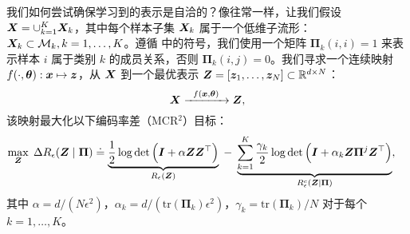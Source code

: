 \documentclass[../../book-main.tex]{subfiles}
\begin{document}

我们如何尝试确保学习到的表示是自洽的？像往常一样，让我们假设 $\bm{X} = \cup_{k=1}^K \bm{X}_k$，其中每个样本子集 $\bm{X}_k$ 属于一个低维子流形：$\bm{X}_k \subset \mathcal{M}_k, k = 1,\ldots, K$。遵循  中的符号，我们使用一个矩阵 $\bm \Pi_k(i,i) = 1$ 来表示样本 $i$ 属于类别 $k$ 的成员关系，否则 $\bm \Pi_k(i,j) = 0$。我们寻求一个连续映射 $f(\cdot,\bm \theta): \bm{x} \mapsto \bm{z}$，从 $\bm{X}$ 到一个最优表示 $\bm{Z} = [\bm{z}_1, \ldots, \bm{z}_N] \subset \mathbb{R}^{d \times N}$：
\begin{equation}
\bm X  \xrightarrow{\hspace{2mm} f(\bm{x}, \bm \theta) \hspace{2mm}} \bm Z, 
\label{eqn:LDR}
\end{equation}
该映射最大化以下编码率差（MCR$^2$）目标：
\begin{equation}\label{eq:mcr2-formulation}
\begin{split}
\max_{\Z} \; \Delta R_\epsilon(\Z  \mid \bm{\Pi}) %
&\doteq \underbrace{\frac{1}{2}\log\det \Big(\I + {\alpha} \Z \Z^\top \Big)}_{R_{\epsilon}(\Z)} \;-\; \underbrace{\sum_{k=1}^{K}\frac{\gamma_k}{2} \log\det\Big(\I + {\alpha_k} \Z \bm{\Pi}^{j} \Z^\top \Big)}_{R^c_{\epsilon}(\Z \mid \bm \Pi)},
\end{split}
\end{equation}
其中 $\alpha = {d}/({N\epsilon^2})$，$\alpha_k = d/({\mathrm{tr}(\bm{\Pi}_k)\epsilon^2})$，$\gamma_k =  {\mathrm{tr}(\bm{\Pi}_{k})}/{N}$ 对于每个 $k = 1,\dots, K$。
\end{document}
